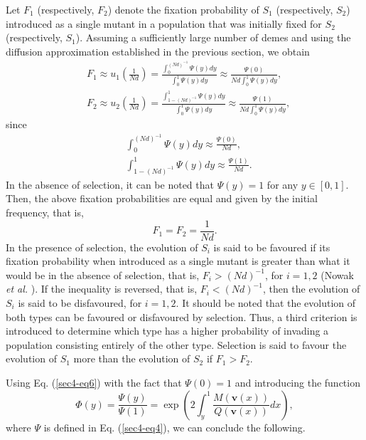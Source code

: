 \documentclass[11pt]{article}
\begin{document}
Let $F_1$ (respectively, $F_2$) denote the fixation probability of $S_1$ (respectively, $S_2$) introduced as a single mutant in a population that was initially fixed for $S_2$ (respectively, $S_1$). Assuming a sufficiently large number of demes and using the diffusion approximation established in the previous section, we obtain
\begin{subequations}\label{sec4-eq6}
\begin{align}\label{sec4-eq7}
&F_1\approx u_1\left(\frac{1}{Nd}\right)=\frac{\int_{0}^{(Nd)^{-1}}\Psi(y)dy}{\int_{0}^1\Psi(y)dy}\approx\frac{\Psi(0)}{Nd\int_{0}^1\Psi(y)dy},\\
&F_2\approx u_2\left(\frac{1}{Nd}\right)=\frac{\int_{1-(Nd)^{-1}}^{1}\Psi(y)dy}{\int_{0}^1\Psi(y)dy}\approx\frac{\Psi(1)}{Nd\int_{0}^1\Psi(y)dy},
\end{align}
\end{subequations}
since
\begin{subequations}
\begin{align}
&\int_{0}^{(Nd)^{-1}}\Psi(y)dy\approx\frac{\Psi(0)}{Nd},\\
&\int_{1-(Nd)^{-1}}^{1}\Psi(y)dy\approx\frac{\Psi(1)}{Nd}.
\end{align}
\end{subequations}
In the absence of selection, it can be noted that $\Psi(y)=1$ for any $y\in [0,1]$. Then, the above fixation probabilities are equal and given by the initial frequency, that is,
\begin{equation}\label{sec4-eq8}
F_1=F_2=\frac{1}{Nd}.
\end{equation}
In the presence of selection, the evolution of $S_i$ is said to be favoured if its fixation probability when introduced as a single mutant is greater than what it would be in the absence of selection, that is, $F_{i}>(Nd)^{-1}$, for $i=1, 2$ (Nowak \textit{et al.} \cite{NSTF2004}). If the inequality is reversed, that is, $F_{i} < (Nd)^{-1}$, then the evolution of $S_i$ is said to be disfavoured, for $i=1,2$.
It should be noted that the evolution of both types can be favoured or disfavoured by selection. Thus, a third criterion is introduced to determine which type has a higher probability of invading a population consisting entirely of the other type. Selection is said to favour the evolution of $S_1$ more than the evolution of $S_2$ if $F_{1}>F_2$.


Using Eq. (\ref{sec4-eq6}) with the fact that $\Psi(0)=1$ and introducing the function
\begin{equation}\label{sec4-eq4bis}
\Phi(y)=\frac{\Psi(y)}{\Psi(1)}=\exp\left(2\int_{y}^{1}\frac{M(\mathbf{v}(x))}{Q(\mathbf{v}(x))}dx\right),
\end{equation}
where $\Psi$ is defined in Eq. (\ref{sec4-eq4}), we can conclude the following.
\end{document}
